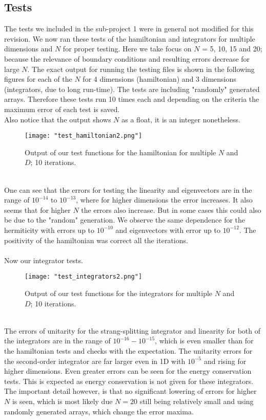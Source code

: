 \documentclass[11pt, letterpaper, onecolumn]{article}
\begin{document}
	\subsection{Tests}
	The tests we included in the sub-project 1 were in general not modified for this revision. We now ran these tests of the hamiltonian and integrators for multiple dimensions and $N$ for proper testing. Here we take focus on $N$ = 5, 10, 15 and 20; because the relevance of boundary conditions and resulting errors decrease for large $N$. The exact output for running the testing files is shown in the following figures for each of the $N$ for 4 dimensions (hamiltonian) and 3 dimensions (integrators, due to long run-time). The tests are including "randomly" generated arrays. Therefore these tests run 10 times each and depending on the criteria the maximum error of each test is saved.\\
	Also notice that the output shows $N$ as a float, it is an integer nonetheless.
	\begin{figure} [h] 
	\begin{center}
	\texttt{[image: "test\_hamiltonian2.png"]}
	\caption{Output of our test functions for the hamiltonian for multiple $N$ and $D$; 10 iterations.}
	\end{center}
	\end{figure}
	\\
	One can see that the errors for testing the linearity and eigenvectors are in the range of $10^{-14}$ to $10^{-13}$, where for higher dimensions the error increases. It also seems that for higher $N$ the errors also increase. But in some cases this could also be due to the "random" generation. We observe the same dependence for the hermiticity with errors up to $10^{-10}$ and eigenvectors with error up to $10^{-12}$. The positivity of the hamiltonian was correct all the iterations.\\
	\\
	Now our integrator tests. 
	\begin{figure} [h] 
	\begin{center}
	\texttt{[image: "test\_integrators2.png"]}
	\caption{Output of our test functions for the integrators for multiple $N$ and $D$; 10 iterations.}
	\end{center}
	\end{figure}
	\\
	The errors of unitarity for the strang-splitting integrator and linearity for both of the integrators are in the range of $10^{-16}-10^{-15}$, which is even smaller than for the hamiltonian tests and checks with the expectation. The unitarity errors for the second-order integrator are far larger even in 1D with $10^{-5}$ and rising for higher dimensions. Even greater errors can be seen for the energy conservation tests. This is expected as energy conservation is not given for these integrators. The important detail however, is that no significant lowering of errors for higher $N$ is seen, which is most likely due $N=20$ still being relatively small and using randomly generated arrays, which change the error maxima.
\end{document}
